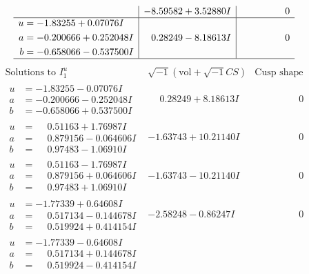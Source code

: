 \documentclass[1p]{elsarticle_modified}
\theoremstyle{definition}
\newcommand{\I}{\sqrt{-1}}
\begin{document}
$$\begin{array}{c|c|c}
 & -8.59582 + 3.52880 I & \phantom{-0.000000 } 0 \\ \hline\begin{aligned}
u &= -1.83255 + 0.07076 I \\
a &= -0.200666 + 0.252048 I \\
b &= -0.658066 - 0.537500 I\end{aligned}
 & \phantom{-}0.28249 - 8.18613 I & \phantom{-0.000000 } 0\\
 \hline 
 \end{array}$$\newpage$$\begin{array}{c|c|c}  
\text{Solutions to }I^u_{1}& \I (\text{vol} + \sqrt{-1}CS) & \text{Cusp shape}\\
 \hline 
\begin{aligned}
u &= -1.83255 - 0.07076 I \\
a &= -0.200666 - 0.252048 I \\
b &= -0.658066 + 0.537500 I\end{aligned}
 & \phantom{-}0.28249 + 8.18613 I & \phantom{-0.000000 } 0 \\ \hline\begin{aligned}
u &= \phantom{-}0.51163 + 1.76987 I \\
a &= \phantom{-}0.879156 - 0.064606 I \\
b &= \phantom{-}0.97483 - 1.06910 I\end{aligned}
 & -1.63743 + 10.21140 I & \phantom{-0.000000 } 0 \\ \hline\begin{aligned}
u &= \phantom{-}0.51163 - 1.76987 I \\
a &= \phantom{-}0.879156 + 0.064606 I \\
b &= \phantom{-}0.97483 + 1.06910 I\end{aligned}
 & -1.63743 - 10.21140 I & \phantom{-0.000000 } 0 \\ \hline\begin{aligned}
u &= -1.77339 + 0.64608 I \\
a &= \phantom{-}0.517134 - 0.144678 I \\
b &= \phantom{-}0.519924 + 0.414154 I\end{aligned}
 & -2.58248 - 0.86247 I & \phantom{-0.000000 } 0 \\ \hline\begin{aligned}
u &= -1.77339 - 0.64608 I \\
a &= \phantom{-}0.517134 + 0.144678 I \\
b &= \phantom{-}0.519924 - 0.414154 I\end{aligned}

\end{array}$$
\end{document}

